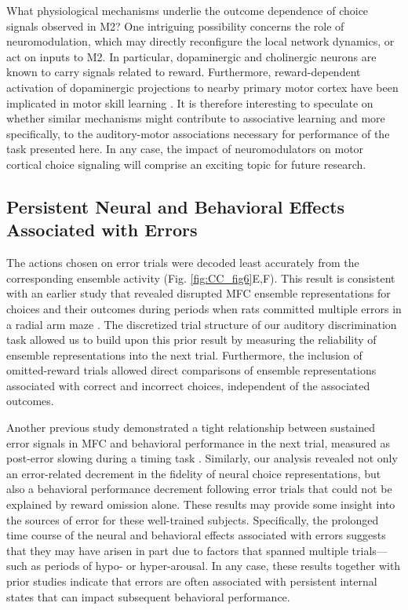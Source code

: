 What physiological mechanisms underlie the outcome dependence of choice signals observed in M2? One intriguing possibility concerns the role of neuromodulation, which may directly reconfigure the local network dynamics, or act on inputs to M2. In particular, dopaminergic \citep{schultz1997neural} and cholinergic \citep{hangya2015central} neurons are known to carry signals related to reward. Furthermore, reward-dependent activation of dopaminergic projections to nearby primary motor cortex have been implicated in motor skill learning \citep{hosp2011dopaminergic, leemburg2018motor}. It is therefore interesting to speculate on whether similar mechanisms might contribute to associative learning \citep{takehara2008spontaneous} and more specifically, to the auditory-motor associations necessary for performance of the task presented here. In any case, the impact of neuromodulators on motor cortical choice signaling will comprise an exciting topic for future research.

\subsection{Persistent Neural and Behavioral Effects Associated with Errors}
The actions chosen on error trials were decoded least accurately from the corresponding ensemble activity (Fig. \ref{fig:CC_fig6}E,F). This result is consistent with an earlier study that revealed disrupted MFC ensemble representations for choices and their outcomes during periods when rats committed multiple errors in a radial arm maze \citep{lapish2008successful, hyman2012action}. The discretized trial structure of our auditory discrimination task allowed us to build upon this prior result by measuring the reliability of ensemble representations into the next trial. Furthermore, the inclusion of omitted-reward trials allowed direct comparisons of ensemble representations associated with correct and incorrect choices, independent of the associated outcomes.

Another previous study demonstrated a tight relationship between sustained error signals in MFC and behavioral performance in the next trial, measured as post-error slowing during a timing task \citep{narayanan2013common}. Similarly, our analysis revealed not only an error-related decrement in the fidelity of neural choice representations, but also a behavioral performance decrement following error trials that could not be explained by reward omission alone. These results may provide some insight into the sources of error for these well-trained subjects. Specifically, the prolonged time course of the neural and behavioral effects associated with errors suggests that they may have arisen in part due to factors that spanned multiple trials—such as periods of hypo- or hyper-arousal. In any case, these results together with prior studies indicate that errors are often associated with persistent internal states that can impact subsequent behavioral performance.

